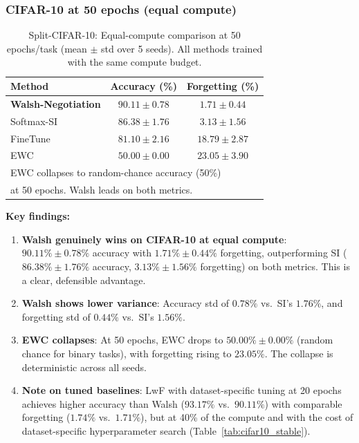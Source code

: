 \documentclass[preprint,review,12pt]{elsarticle}
\begin{document}
\subsubsection{CIFAR-10 at 50 epochs (equal compute)}

\begin{table}[t]
\centering
\caption{Split-CIFAR-10: Equal-compute comparison at 50 epochs/task (mean $\pm$ std over 5 seeds). All methods trained with the same compute budget.}
\label{tab:equal_compute_cifar10}
\begin{tabular}{lcc}
\toprule
Method & Accuracy (\%) & Forgetting (\%) \\
\midrule
\textbf{Walsh-Negotiation} & $\mathbf{90.11 \pm 0.78}$ & $\mathbf{1.71 \pm 0.44}$ \\
Softmax-SI & $86.38 \pm 1.76$ & $3.13 \pm 1.56$ \\
FineTune & $81.10 \pm 2.16$ & $18.79 \pm 2.87$ \\
EWC & $50.00 \pm 0.00$ & $23.05 \pm 3.90$ \\
\bottomrule
\multicolumn{3}{l}{\scriptsize EWC collapses to random-chance accuracy (50\%)} \\
\multicolumn{3}{l}{\scriptsize at 50 epochs. Walsh leads on both metrics.}
\end{tabular}
\end{table}

\textbf{Key findings:}
\begin{enumerate}
\item \textbf{Walsh genuinely wins on CIFAR-10 at equal compute}: $90.11\% \pm 0.78\%$ accuracy with $1.71\% \pm 0.44\%$ forgetting, outperforming SI ($86.38\% \pm 1.76\%$ accuracy, $3.13\% \pm 1.56\%$ forgetting) on both metrics. This is a clear, defensible advantage.
\item \textbf{Walsh shows lower variance}: Accuracy std of $0.78\%$ vs.\ SI's $1.76\%$, and forgetting std of $0.44\%$ vs.\ SI's $1.56\%$.
\item \textbf{EWC collapses}: At 50 epochs, EWC drops to $50.00\% \pm 0.00\%$ (random chance for binary tasks), with forgetting rising to $23.05\%$. The collapse is deterministic across all seeds.
\item \textbf{Note on tuned baselines}: LwF with dataset-specific tuning at 20 epochs achieves higher accuracy than Walsh ($93.17\%$ vs.\ $90.11\%$) with comparable forgetting ($1.74\%$ vs.\ $1.71\%$), but at 40\% of the compute and with the cost of dataset-specific hyperparameter search (Table~\ref{tab:cifar10_stable}).
\end{enumerate}
\end{document}
